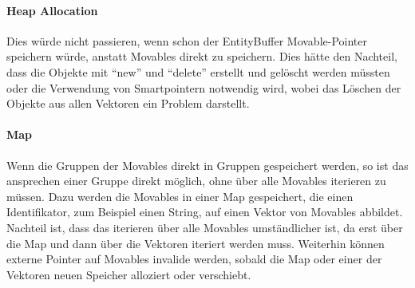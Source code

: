 \documentclass[11pt,a4paper]{article}
\begin{document}
\paragraph{Heap Allocation}
Dies würde nicht passieren, wenn schon der EntityBuffer Movable-Pointer speichern würde, anstatt Movables direkt zu speichern. Dies hätte den Nachteil, dass die Objekte mit ``new'' und ``delete'' erstellt und gelöscht werden müssten oder die Verwendung von Smartpointern notwendig wird, wobei das Löschen der Objekte aus allen Vektoren ein Problem darstellt.
\paragraph{Map}
Wenn die Gruppen der Movables direkt in Gruppen gespeichert werden, so ist das ansprechen einer Gruppe direkt möglich, ohne über alle Movables iterieren zu müssen. Dazu werden die Movables in einer Map gespeichert, die einen Identifikator, zum Beispiel einen String, auf einen Vektor von Movables abbildet. Nachteil ist, dass das iterieren über alle Movables umständlicher ist, da erst über die Map und dann über die Vektoren iteriert werden muss. Weiterhin können externe Pointer auf Movables invalide werden, sobald die Map oder einer der Vektoren neuen Speicher alloziert oder verschiebt.
\end{document}
